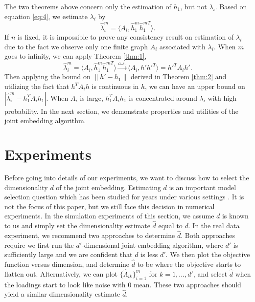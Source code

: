 \documentclass[10pt,journal,compsoc]{IEEEtran}
\begin{document}
\noindent The two theorems above concern only the estimation of $h_1$, but not $\lambda_i$. Based on equation \eqref{eq:4}, we estimate $\lambda_i$ by
\[\hat{\lambda}_i^m= \langle A_i,\hat{h}_1^m \hat{h}_1^{m T} \rangle. \]
If $n$ is fixed, it is impossible to prove any consistency result on estimation of $\lambda_i$ due to the fact we observe only one finite graph $A_i$ associated with $\lambda_i$. When $m$ goes to infinity, we can apply Theorem \ref{thm:1},
\[\hat{\lambda}_i^m = \langle A_i,\hat{h}_1^m \hat{h}_1^{mT} \rangle \overset{a.s.}{\rightarrow} \langle A_i,h' h'^T \rangle = h'^T A_i h'.\]
Then applying the bound on $\|h'-h_1\|$ derived in Theorem \ref{thm:2} and utilizing the fact that $h^T A_i h$ is continuous in $h$, we can have an upper bound on $|\hat{\lambda}_i^m - h_1^T A_i h_1|$. When $A_i$ is large, $h_1^T A_i h_1$ is concentrated around $\lambda_i$ with high probability. In the next section, we demonstrate properties and utilities of the joint embedding algorithm. 

\section{Experiments}
Before going into details of our experiments, we want to discuss how to select the dimensionality $d$ of the joint embedding. Estimating $d$ is an important model selection question which has been studied for years under various settings \cite{kohavi1995study}. It is not the focus of this paper, but we still face this decision in numerical experiments. In the simulation experiments of this section, we assume $d$ is known to us and simply set the dimensionality estimate $\hat{d}$ equal to $d$. In the real data experiment, we recommend two approaches to determine $\hat{d}$. Both approaches require we first run the $d'$-dimensional joint embedding algorithm, where $d'$ is sufficiently large and we are confident that $d$ is less $d'$. We then plot the objective function versus dimension, and determine $\hat{d}$ to be where the objective starts to flatten out. Alternatively, we can plot $\{\hat{\Lambda}_{ik}\}_{i=1}^m$ for $k=1,...,d'$, and select $\hat{d}$ when the loadings start to look like noise with $0$ mean. These two approaches should yield a similar dimensionality estimate $\hat{d}$. 
\end{document}
